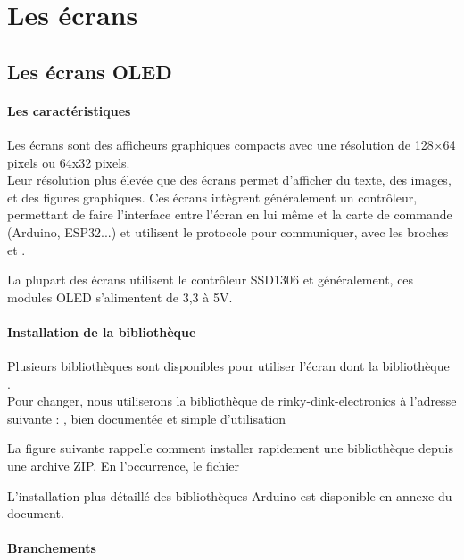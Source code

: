 \part{Les écrans}

\chapter{Les écrans OLED}

\subsection{Les caractéristiques}
Les écrans  sont des afficheurs graphiques 
compacts avec une résolution de 128×64 pixels ou 64x32 pixels.\\
Leur résolution plus élevée que des écrans  permet d’afficher du texte, des images, et des figures 
graphiques. Ces écrans intègrent généralement un contrôleur, permettant de faire l’interface entre l’écran
en lui même et la carte de commande (Arduino, ESP32...) et utilisent le protocole  pour communiquer, avec les broches  et .


La plupart des écrans utilisent le contrôleur SSD1306 et généralement, ces modules OLED s’alimentent de 3,3 à 5V.


\subsection{Installation de la bibliothèque}

Plusieurs bibliothèques sont disponibles pour utiliser l'écran dont la bibliothèque .\\

Pour changer, nous utiliserons la bibliothèque de rinky-dink-electronics à l'adresse suivante : 
,  bien documentée et simple d’utilisation

La figure suivante rappelle comment installer rapidement une bibliothèque depuis une archive ZIP.
En l’occurrence, le fichier 

L'installation plus détaillé des bibliothèques Arduino est disponible en annexe du document.



\subsection{Branchements}

